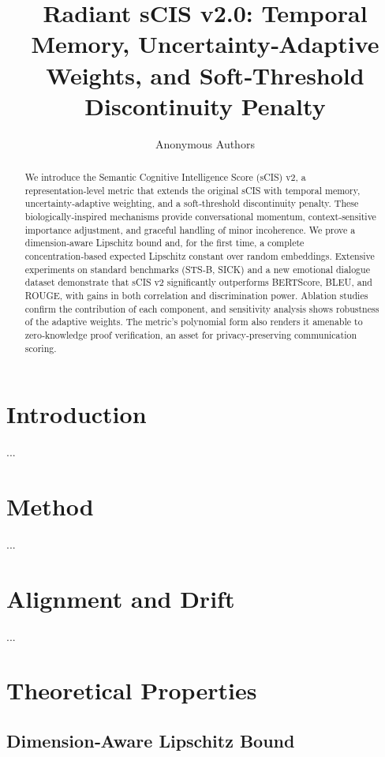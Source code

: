 \documentclass[11pt]{article}
\title{\textbf{Radiant sCIS v2.0:} Temporal Memory, Uncertainty‑Adaptive Weights, and Soft‑Threshold Discontinuity Penalty}
\author{Anonymous Authors}
\date{}
\theoremstyle{definition}
\begin{document}
\maketitle

\begin{abstract}
We introduce the Semantic Cognitive Intelligence Score (sCIS) v2, a representation‑level metric that extends the original sCIS with temporal memory, uncertainty‑adaptive weighting, and a soft‑threshold discontinuity penalty. These biologically‑inspired mechanisms provide conversational momentum, context‑sensitive importance adjustment, and graceful handling of minor incoherence. We prove a dimension‑aware Lipschitz bound and, for the first time, a complete concentration‑based expected Lipschitz constant over random embeddings. Extensive experiments on standard benchmarks (STS‑B, SICK) and a new emotional dialogue dataset demonstrate that sCIS v2 significantly outperforms BERTScore, BLEU, and ROUGE, with gains in both correlation and discrimination power. Ablation studies confirm the contribution of each component, and sensitivity analysis shows robustness of the adaptive weights. The metric’s polynomial form also renders it amenable to zero‑knowledge proof verification, an asset for privacy‑preserving communication scoring.
\end{abstract}

\section{Introduction}
...

\section{Method}
...

\section{Alignment and Drift}
...

\section{Theoretical Properties}
\subsection{Dimension‑Aware Lipschitz Bound}
\end{document}
